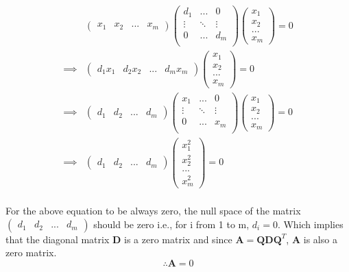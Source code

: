 \documentclass[12pt, letterpaper]{article}
\begin{document}
\begin{align*}
  &\begin{pmatrix} x_1&x_2&...&x_m \end{pmatrix}
    \begin{pmatrix}
      d_1& ...&0\\ \vdots&\ddots&\vdots\\ 0  & ...&d_m\\
    \end{pmatrix}
    \begin{pmatrix} x_1\\x_2\\...\\x_m \end{pmatrix} = 0\\
  \implies &\begin{pmatrix} d_1x_1&d_2x_2&...&d_mx_m \end{pmatrix}
            \begin{pmatrix} x_1\\x_2\\...\\x_m \end{pmatrix} = 0\\
  \implies &\begin{pmatrix} d_1&d_2&...&d_m \end{pmatrix}
             \begin{pmatrix}
               x_1& ...&0\\ \vdots&\ddots&\vdots\\ 0  & ...&x_m\\
             \end{pmatrix}
             \begin{pmatrix} x_1\\x_2\\...\\x_m \end{pmatrix} = 0\\
  \implies &\begin{pmatrix} d_1&d_2&...&d_m \end{pmatrix}
            \begin{pmatrix} x_1^2\\x_2^2\\...\\x_m^2 \end{pmatrix} = 0\\
\end{align*}

For the above equation to be always zero, the null space of the matrix
$\begin{pmatrix} d_1&d_2&...&d_m \end{pmatrix}$ should be zero i.e., for i from 1 to m, $d_i = 0$. Which implies that the diagonal matrix $\mathbf{D}$ is a zero matrix and since $\mathbf{A} = \mathbf{QDQ}^T$, $\mathbf{A}$ is also a zero matrix.
\[\therefore \boxed{\mathbf{A} = 0}\]
\end{document}
